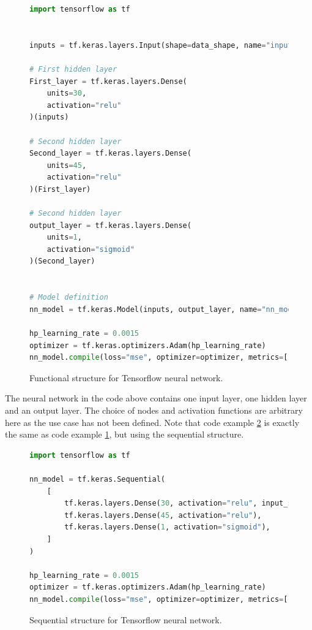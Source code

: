 \begin{figure}[H]
    \centering
\begin{lstlisting}[language=Python, style=pythonstyle, label={code:python_func_example_general}]
import tensorflow as tf


inputs = tf.keras.layers.Input(shape=data_shape, name="input")

# First hidden layer
First_layer = tf.keras.layers.Dense(
    units=30,
    activation="relu"
)(inputs)

# Second hidden layer
Second_layer = tf.keras.layers.Dense(
    units=45, 
    activation="relu"
)(First_layer)

# Second hidden layer
output_layer = tf.keras.layers.Dense(
    units=1, 
    activation="sigmoid"
)(Second_layer)


# Model definition
nn_model = tf.keras.Model(inputs, output_layer, name="nn_model")

hp_learning_rate = 0.0015
optimizer = tf.keras.optimizers.Adam(hp_learning_rate)
nn_model.compile(loss="mse", optimizer=optimizer, metrics=["mse"]) 
\end{lstlisting}
\caption[Functional structure]{Functional structure for Tensorflow neural network.}
\label{code:functional}
\end{figure}
The neural network in the code above contains one input layer, one hidden layer and an output layer. The choice of nodes and activation functions are 
arbitrary here as the use case has not been defined. Note that code example \ref{code:sequatial} is exactly the same as code example \ref{code:functional},
but using the sequential structure.

\begin{figure}[H]
    \centering
\begin{lstlisting}[language=Python, style=pythonstyle, label={code:python_seq_example}]
import tensorflow as tf

nn_model = tf.keras.Sequential(
    [
        tf.keras.layers.Dense(30, activation="relu", input_shape=data_shape),
        tf.keras.layers.Dense(45, activation="relu"),
        tf.keras.layers.Dense(1, activation="sigmoid"),
    ]
)

hp_learning_rate = 0.0015
optimizer = tf.keras.optimizers.Adam(hp_learning_rate)
nn_model.compile(loss="mse", optimizer=optimizer, metrics=["mse"]) 
\end{lstlisting}
\caption[Sequential structure]{Sequential structure for Tensorflow neural network.}
\label{code:sequatial}
\end{figure}

